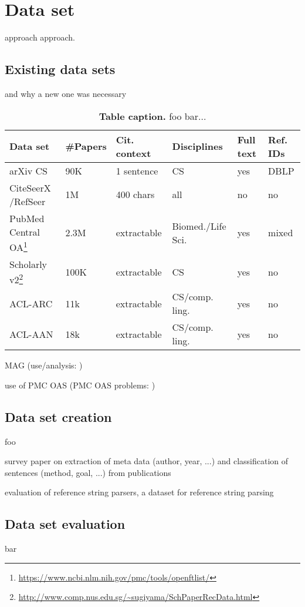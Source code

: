 \chapter{Data set}\label{chap:dataset}
approach approach.

\section{Existing data sets}
and why a new one was necessary

\begin{table}[ht]
\begin{center}
    \begin{tabular}{llllll}
    \toprule
    Data set & \#Papers & Cit. context & Disciplines & Full text & Ref. IDs \\
    \midrule
    arXiv CS    &  90K & 1 sentence & CS & yes & DBLP \\ %
    CiteSeerX /RefSeer  &  1M & 400 chars & all & no & no \\ %
    PubMed Central OA\footnote{\url{https://www.ncbi.nlm.nih.gov/pmc/tools/openftlist/}} & 2.3M & extractable & Biomed./Life Sci. & yes & mixed \\
    Scholarly v2\footnote{\url{http://www.comp.nus.edu.sg/~sugiyama/SchPaperRecData.html}}  & 100K & extractable & CS & yes & no \\
    ACL-ARC  & 11k & extractable & CS/comp. ling. & yes & no \\ %
    ACL-AAN  & 18k & extractable & CS/comp. ling. & yes & no  \\ %
    \bottomrule
    \end{tabular}
\end{center}
    \caption[Table caption]{\textbf{Table caption.} foo bar...\\}
    \label{tab:datasets}
\end{table}

MAG\cite{Sinha2015} (use/analysis: \cite{Herrmannova2016,Paszcza2016,Hug2017})

use of PMC OAS\cite{Gipp2015,Duma2016,Galke2018,Bhagavatula2018} (PMC OAS problems: \cite{Gipp2015})

\section{Data set creation}
foo

survey paper on extraction of meta data (author, year, ...) and classification of sentences (method, goal, ...) from publications\cite{Nasar2018}

evaluation of reference string parsers\cite{Tkaczyk2018}, a dataset for reference string parsing\cite{Anzaroot2013}

\section{Data set evaluation}
bar

